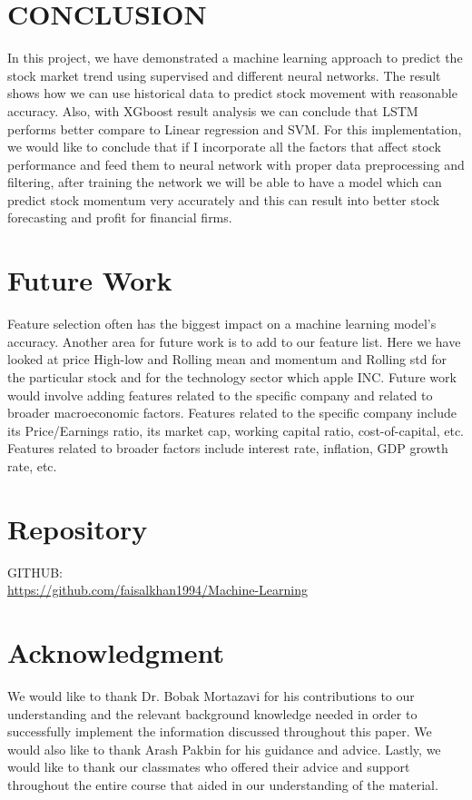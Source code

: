 \usepackage{fancyhdr}\documentclass[conference]{IEEEtran}
\begin{document}
\section{CONCLUSION}
In this project, we have demonstrated a machine learning approach to predict the stock market trend using supervised and different neural networks. The result shows how we can use historical data to predict stock movement with reasonable accuracy. Also, with XGboost result analysis we can conclude that LSTM performs better compare to Linear regression and SVM. For this implementation, we would like to conclude that if I incorporate all the factors that affect stock performance and feed them to neural network with proper data preprocessing and filtering, after training the network we will be able to have a model which can predict stock momentum very accurately and this can result into better stock forecasting and profit for financial firms.

\section{Future Work}
Feature selection often has the biggest impact on a machine learning model’s accuracy. Another area for future work is to add to our feature list. Here we have looked at price High-low and Rolling mean and  momentum and Rolling std for the particular stock and for the technology sector which apple INC. Future work would involve adding features related to the specific company and related to broader macroeconomic factors. Features related to the specific company include its Price/Earnings ratio, its market cap, working capital ratio, cost-of-capital, etc. Features related to broader factors include interest rate, inflation, GDP growth rate, etc.

\section{Repository}
GITHUB:\\
\url{https://github.com/faisalkhan1994/Machine-Learning}

\section*{Acknowledgment}
We would like to thank Dr. Bobak Mortazavi for his contributions to our understanding and the relevant background knowledge needed in order to successfully implement the information discussed throughout this paper. We would also like to thank Arash Pakbin for his guidance and advice. Lastly, we would like to thank our classmates who offered their advice and support throughout the entire course that aided in our understanding of the material.
\end{document}
